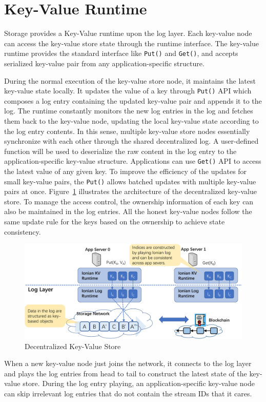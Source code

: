 \section{Key-Value Runtime}

\projabbrev Storage provides a Key-Value runtime upon the log layer. 
Each key-value node can access the key-value store state through the runtime interface. 
The key-value runtime provides the standard interface like \texttt{Put()} and \texttt{Get()}, and accepts serialized key-value pair from any application-specific structure. 

During the normal execution of the key-value store node, it maintains the latest key-value state locally. It updates the value of a key through \texttt{Put()} API which composes a log entry containing the updated key-value pair and appends it to the log. 
The runtime constantly monitors the new log entries in the log and fetches them back to the key-value node, updating the local key-value state according to the log entry contents. 
In this sense, multiple key-value store nodes essentially synchronize with each other through the shared decentralized log.
A user-defined function will be used to deserialize the raw content in the log entry to the application-specific key-value structure.
Applications can use \texttt{Get()} API to access the latest value of any given key. 
To improve the efficiency of the updates for small key-value pairs, the \texttt{Put()} allows batched updates with multiple key-value pairs at once. 
Figure~\ref{fig:kv} illustrates the architecture of the decentralized key-value store. 
To manage the access control, the ownership information of each key can also be maintained in the log entries.
All the honest key-value nodes follow the same update rule for the keys based on the ownership to achieve state consistency.

\begin{figure}[H]	
	\includegraphics[width=\textwidth]{figure/kv-crop.pdf}
	\caption{Decentralized Key-Value Store}
	\label{fig:kv}
\end{figure}

When a new key-value node just joins the network, it connects to the log layer and plays the log entries from head to tail to construct the latest state of the key-value store.
During the log entry playing, an application-specific key-value node can skip irrelevant log entries that do not contain the stream IDs that it cares.
